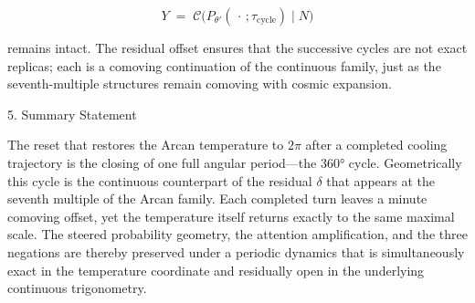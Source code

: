 \[
Y\;=\;\mathcal{C}\bigl(P_{\theta'}(\,\cdot\,;\tau_{\text{cycle}})\mid N\bigr)
\]

remains intact. The residual offset ensures that the successive cycles are not exact replicas; each is a comoving continuation of the continuous family, just as the seventh-multiple structures remain comoving with cosmic expansion.

5. Summary Statement

The reset that restores the Arcan temperature to \(2\pi\) after a completed cooling trajectory is the closing of one full angular period—the 360° cycle. Geometrically this cycle is the continuous counterpart of the residual \(\delta\) that appears at the seventh multiple of the Arcan family. Each completed turn leaves a minute comoving offset, yet the temperature itself returns exactly to the same maximal scale. The steered probability geometry, the attention amplification, and the three negations are thereby preserved under a periodic dynamics that is simultaneously exact in the temperature coordinate and residually open in the underlying continuous trigonometry.
